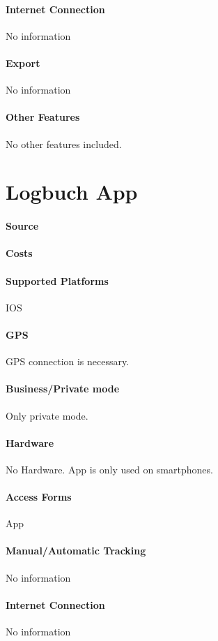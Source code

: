 \paragraph{Internet Connection} No information
\paragraph{Export} No information
\paragraph{Other Features} No other features included.
\newpage
\section{Logbuch App}
\paragraph{Source} 
\paragraph{Costs} 
\paragraph{Supported Platforms} IOS
\paragraph{GPS} GPS connection is necessary.
\paragraph{Business/Private mode} Only private mode.
\paragraph{Hardware} No Hardware. App is only used on smartphones.
\paragraph{Access Forms} App
\paragraph{Manual/Automatic Tracking} No information
\paragraph{Internet Connection} No information
